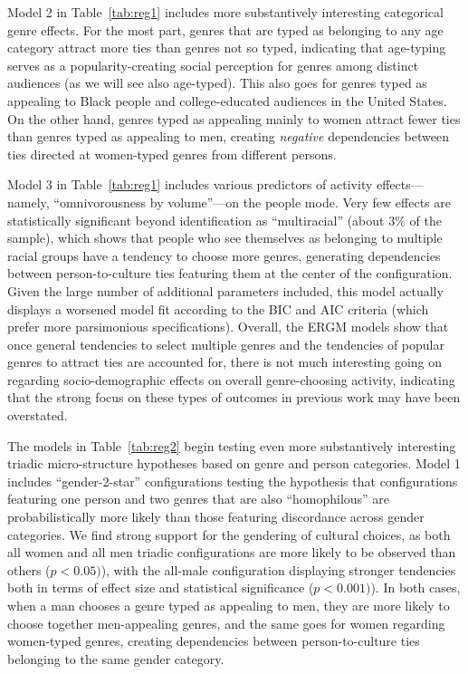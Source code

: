 \documentclass[preprint,12pt,authoryear]{elsarticle}
\begin{document}
Model 2 in Table~\ref{tab:reg1} includes more substantively interesting categorical genre effects. For the most part, genres that are typed as belonging to any age category attract more ties than genres not so typed, indicating that age-typing serves as a popularity-creating social perception for genres among distinct audiences (as we will see also age-typed). This also goes for genres typed as appealing to Black people and college-educated audiences in the United States. On the other hand, genres typed as appealing mainly to women attract fewer ties than genres typed as appealing to men, creating \textit{negative} dependencies between ties directed at women-typed genres from different persons. 

Model 3 in Table~\ref{tab:reg1} includes various predictors of activity effects---namely, ``omnivorousness by volume''---on the people mode. Very few effects are statistically significant beyond identification as ``multiracial'' (about $3\%$ of the sample), which shows that people who see themselves as belonging to multiple racial groups have a tendency to choose more genres, generating dependencies between person-to-culture ties featuring them at the center of the configuration. Given the large number of additional parameters included, this model actually displays a worsened model fit according to the BIC and AIC criteria (which prefer more parsimonious specifications). Overall, the ERGM models show that once general tendencies to select multiple genres and the tendencies of popular genres to attract ties are accounted for, there is not much interesting going on regarding socio-demographic effects on overall genre-choosing activity, indicating that the strong focus on these types of outcomes in previous work may have been overstated. 

The models in Table~\ref{tab:reg2} begin testing even more substantively interesting triadic micro-structure hypotheses based on genre and person categories. Model 1 includes ``gender-2-star'' configurations testing the hypothesis that configurations featuring one person and two genres that are also ``homophilous'' are probabilistically more likely than those featuring discordance across gender categories. We find strong support for the gendering of cultural choices, as both all women and all men triadic configurations are more likely to be observed than others ($p < 0.05)$), with the all-male configuration displaying stronger tendencies both in terms of effect size and statistical significance ($p < 0.001)$). In both cases, when a man chooses a genre typed as appealing to men, they are more likely to choose together men-appealing genres, and the same goes for women regarding women-typed genres, creating dependencies between person-to-culture ties belonging to the same gender category. 
\end{document}
